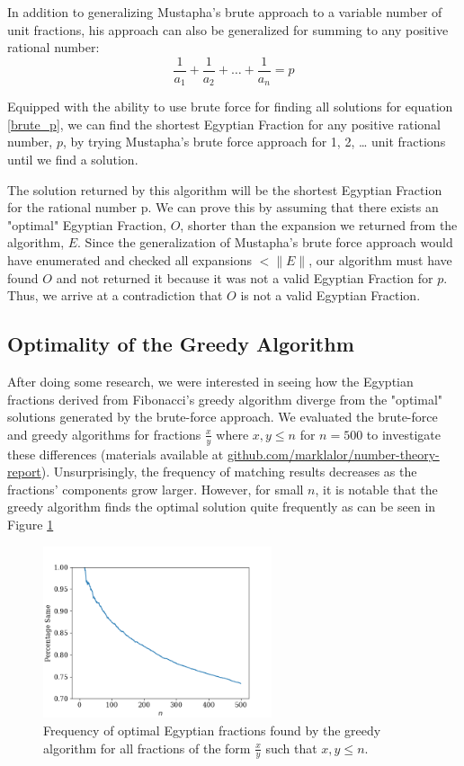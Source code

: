 \documentclass[paper=a4, fontsize=11pt]{scrartcl}
\numberwithin{equation}{section}	 %
\numberwithin{figure}{section}	 %
\numberwithin{table}{section}	 %
\begin{document}
In addition to generalizing Mustapha’s brute approach to a variable number of unit fractions, his approach can also be generalized for summing to any positive rational number:
\begin{equation}\label{brute_p}
	\frac{1}{a_1} + \frac{1}{a_2} + \ldots + \frac{1}{a_n} = p
\end{equation}

Equipped with the ability to use brute force for finding all solutions for equation \ref{brute_p}, we can find the shortest Egyptian Fraction for any positive rational number, $p$, by trying Mustapha’s brute force approach for 1, 2, … unit fractions until we find a solution.

The solution returned by this algorithm will be the shortest Egyptian Fraction for the rational number p. We can prove this by assuming that there exists an "optimal" Egyptian Fraction, $O$, shorter than the expansion we returned from the algorithm, $E$. Since the generalization of Mustapha’s brute force approach would have enumerated and checked all expansions $< \|E\|$, our algorithm must have found $O$ and not returned it because it was not a valid Egyptian Fraction for $p$. Thus, we arrive at a contradiction that $O$ is not a valid Egyptian Fraction. 

\subsection{Optimality of the Greedy Algorithm}\label{sec:optimality}
After doing some research, we were interested in seeing how the Egyptian fractions derived from Fibonacci’s greedy algorithm diverge from the "optimal" solutions generated by the brute-force approach. We evaluated the brute-force and greedy algorithms for fractions $\frac{x}{y}$ where $x,y \leq n$ for $n=500$ to investigate these differences (materials available at \href{https://github.com/marklalor/number-theory-report}{github.com/marklalor/number-theory-report}). Unsurprisingly, the frequency of matching results decreases as the fractions' components grow larger. However, for small $n$, it is notable that the greedy algorithm finds the optimal solution quite frequently as can be seen in Figure \ref{fig:n_freq}

\begin{figure}[t]
\centering
\includegraphics[width=0.60\textwidth]{n_percent_graph}
\caption{Frequency of optimal Egyptian fractions found by the greedy algorithm for all fractions of the form $\frac{x}{y}$ such that $x,y \leq n$.}
\label{fig:n_freq}
\end{figure}
\end{document}
